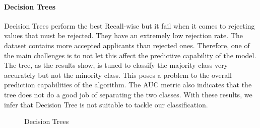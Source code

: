\documentclass[conference]{IEEEtran}
\begin{document}
\paragraph{\textbf{Decision Trees}}

Decision Trees perform the best Recall-wise but it fail when it comes to rejecting values that must be rejected. They have an extremely low rejection rate. The dataset contains more accepted applicants than rejected ones. Therefore, one of the main challenges is to not let this affect the predictive capability of the model. The tree, as the results show, is tuned to classify the majority class very accurately but not the minority class. This poses a problem to the overall prediction capabilities of the algorithm. The AUC metric also indicates that the tree does not do a good job of separating the two classes. With these results, we infer that Decision Tree is not suitable to tackle our classification.
\begin{figure}[h]%
    \centering
    \qquad
    \caption{Decision Trees}%
    \label{fig:}%
\end{figure}
\\
\end{document}
